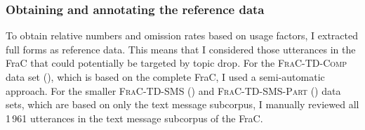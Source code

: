 \subsubsection{Obtaining and annotating the reference data}\label{sec:corpus.reference}

\largerpage[-1]
To obtain relative numbers and omission rates based on usage factors, I extracted full forms as reference data.
This means that I considered those utterances in the FraC that could potentially be targeted by topic drop.
For the \textsc{FraC-TD-Comp} data set (), which is based on the complete FraC, I used a semi-automatic approach.
For the smaller  \textsc{FraC-TD-SMS}  () and \textsc{FraC-TD-SMS-Part} () data sets, which are based on only the text message subcorpus, I manually reviewed all 1\,961 utterances in the text message subcorpus of the FraC.


